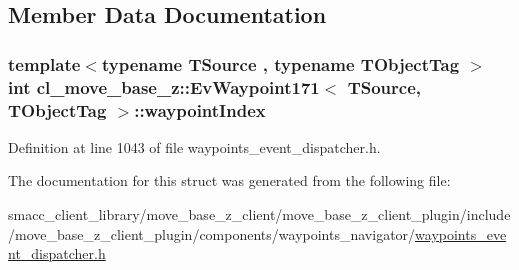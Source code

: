 \subsection{Member Data Documentation}
\subsubsection[{\texorpdfstring{waypoint\+Index}{waypointIndex}}]{\setlength{\rightskip}{0pt plus 5cm}template$<$typename T\+Source , typename T\+Object\+Tag $>$ int {\bf cl\+\_\+move\+\_\+base\+\_\+z\+::\+Ev\+Waypoint171}$<$ T\+Source, T\+Object\+Tag $>$\+::waypoint\+Index}\hypertarget{structcl__move__base__z_1_1EvWaypoint171_aed2adc34b55acddbb291cf4c783833d1}{}\label{structcl__move__base__z_1_1EvWaypoint171_aed2adc34b55acddbb291cf4c783833d1}


Definition at line 1043 of file waypoints\+\_\+event\+\_\+dispatcher.\+h.



The documentation for this struct was generated from the following file\+:\begin{DoxyCompactItemize}
\item 
smacc\+\_\+client\+\_\+library/move\+\_\+base\+\_\+z\+\_\+client/move\+\_\+base\+\_\+z\+\_\+client\+\_\+plugin/include/move\+\_\+base\+\_\+z\+\_\+client\+\_\+plugin/components/waypoints\+\_\+navigator/\hyperlink{waypoints__event__dispatcher_8h}{waypoints\+\_\+event\+\_\+dispatcher.\+h}\end{DoxyCompactItemize}

